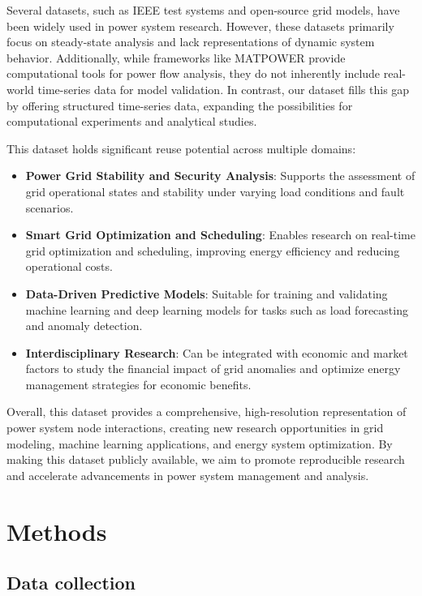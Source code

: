 \documentclass[12pt]{article}
\begin{document}
Several datasets, such as IEEE test systems and open-source grid models, have been widely used in power system research. 
However, these datasets primarily focus on steady-state analysis and lack representations of dynamic system behavior. Additionally, 
while frameworks like MATPOWER provide computational tools for power flow analysis, they do not inherently include real-world time-series data for model validation.
 In contrast, our dataset fills this gap by offering structured time-series data, expanding the possibilities for computational experiments and analytical studies.  

This dataset holds significant reuse potential across multiple domains:

\begin{itemize}
    \item \textbf{\small Power Grid Stability and Security Analysis}: Supports the assessment of grid operational states and stability under varying load conditions and fault scenarios.  
    \item \textbf{\small Smart Grid Optimization and Scheduling}: Enables research on real-time grid optimization and scheduling, improving energy efficiency and reducing operational costs.  
    \item \textbf{\small Data-Driven Predictive Models}: Suitable for training and validating machine learning and deep learning models for tasks such as load forecasting and anomaly detection.  
    \item \textbf{\small Interdisciplinary Research}: Can be integrated with economic and market factors to study the financial impact of grid anomalies and optimize energy management strategies for economic benefits.  
\end{itemize}

Overall, this dataset provides a comprehensive, high-resolution representation of power system node interactions,
creating new research opportunities in grid modeling, machine learning applications, and energy system optimization.
By making this dataset publicly available, we aim to promote reproducible research and accelerate advancements in power system management and analysis.

\section*{Methods}
\subsection*{Data collection}
\end{document}

